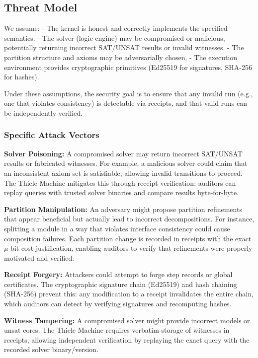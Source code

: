 \documentclass[11pt]{article}
\begin{document}
\subsection{Threat Model}

We assume:
- The kernel is honest and correctly implements the specified semantics.
- The solver (logic engine) may be compromised or malicious, potentially returning incorrect SAT/UNSAT results or invalid witnesses.
- The partition structure and axioms may be adversarially chosen.
- The execution environment provides cryptographic primitives (Ed25519 for signatures, SHA-256 for hashes).

Under these assumptions, the security goal is to ensure that any invalid run (e.g., one that violates consistency) is detectable via receipts, and that valid runs can be independently verified.

\subsubsection{Specific Attack Vectors}

\textbf{Solver Poisoning:} A compromised solver may return incorrect SAT/UNSAT results or fabricated witnesses. For example, a malicious solver could claim that an inconsistent axiom set is satisfiable, allowing invalid transitions to proceed. The Thiele Machine mitigates this through receipt verification: auditors can replay queries with trusted solver binaries and compare results byte-for-byte.

\textbf{Partition Manipulation:} An adversary might propose partition refinements that appear beneficial but actually lead to incorrect decompositions. For instance, splitting a module in a way that violates interface consistency could cause composition failures. Each partition change is recorded in receipts with the exact $\mu$-bit cost justification, enabling auditors to verify that refinements were properly motivated and verified.

\textbf{Receipt Forgery:} Attackers could attempt to forge step records or global certificates. The cryptographic signature chain (Ed25519) and hash chaining (SHA-256) prevent this: any modification to a receipt invalidates the entire chain, which auditors can detect by verifying signatures and recomputing hashes.

\textbf{Witness Tampering:} A compromised solver might provide incorrect models or unsat cores. The Thiele Machine requires verbatim storage of witnesses in receipts, allowing independent verification by replaying the exact query with the recorded solver binary/version.
\end{document}
